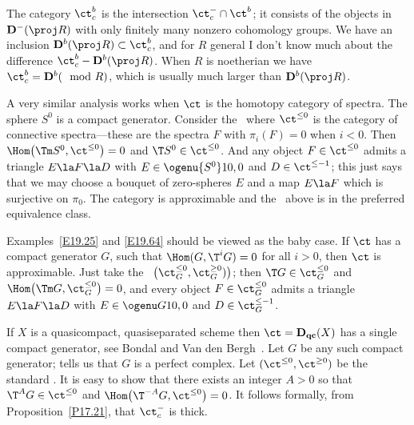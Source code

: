 \documentclass[11pt]{amsart}
\newcommand{\D}{{\mathbf D}}
\newcommand{\Dqc}{{\mathbf D_{\text{\bf qc}}}}
\begin{document}
The category $\ct^b_c$ is the intersection $\ct^-_c\cap\ct^b$;
it consists of the objects in $\D^-(\proj R)$
with only finitely many nonzero cohomology groups.
We have an inclusion $\D^b(\proj R)\subset\ct^b_c$,
and for $R$ general I don't know much
about the difference $\ct^b_c-\D^b(\proj R)$.
When $R$ is noetherian we have $\ct^b_c=\D^b(\mod R)$, which
is usually much larger than $\D^b(\proj R)$.
\eexm

A very similar analysis works when $\ct$ is the homotopy category of spectra.
The sphere $S^0$ is a compact generator.
Consider the \tstr\ where $\ct^{\leq0}$ is the category of connective
spectra---these are the spectra $F$ with $\pi_i(F)=0$ when $i<0$.
Then $\Hom\big(\Tm S^0,\ct^{\leq0}\big)=0$ and $\T S^0\in\ct^{\leq0}$.
And any object $F\in\ct^{\leq0}$ admits a triangle
$E\la F\la D$ with $E\in\ogenu {S^0}1{0,0}$ and $D\in\ct^{\leq-1}$; this
just says that we may choose a bouquet of zero-spheres $E$ and a map
$E\la F$ which is surjective on $\pi_0$. The category is
approximable and the \tstr\ above is in the preferred
equivalence class.
\eexm

Examples~\ref{E19.25} and \ref{E19.64} should be viewed as the baby case.
If $\ct$ has a compact generator $G$, such that $\Hom(G,\T^iG)=0$ for
all $i>0$, then $\ct$ is approximable. Just take the \tstr\
$\big(\ct_G^{\leq0},\ct_G^{\geq0})\big)$; then
$\T G\in\ct^{\leq0}_G$ and $\Hom\big(\Tm G,\ct_G^{\leq0}\big)=0$,
and every object $F\in\ct_G^{\leq0}$ admits a triangle
$E\la F\la D$ with $E\in\ogenu G1{0,0}$ and $D\in\ct_G^{\leq-1}$.
\ermk


If $X$ is a quasicompact, quasiseparated scheme then $\ct=\Dqc(X)$ has
a single compact generator, see Bondal and Van den
Bergh~\cite[Theorem~3.1.1(ii)]{BondalvandenBergh04}.
Let $G$ be any such compact generator;
\cite[Theorem~3.1.1(i)]{BondalvandenBergh04}
tells us that $G$ is a perfect complex.
Let $(\ct^{\leq0},\ct^{\geq0})$ be the standard \tstr.
It is easy to show that there exists an integer $A>0$ so
that $\T^{A}G\in\ct^{\leq0}$ and $\Hom\big(\T^{-A}G,\ct^{\leq0}\big)=0$.
It follows formally, from Proposition~\ref{P17.21}, that $\ct^-_c$
is thick.
\end{document}
